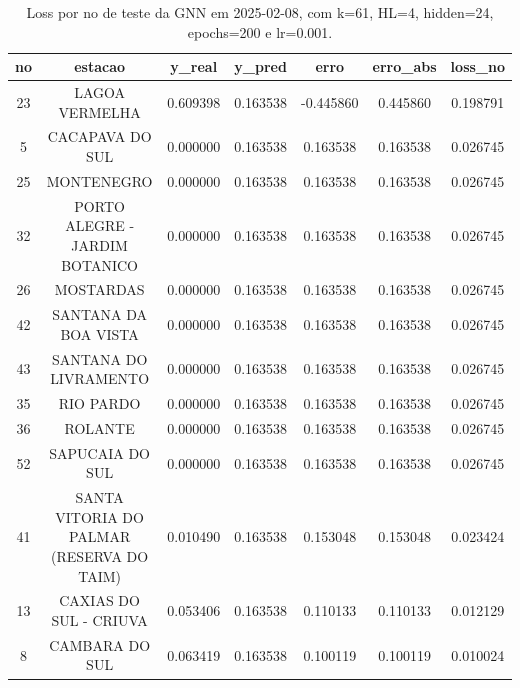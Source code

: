 \begin{table}[h]
\centering
\caption{Loss por no de teste da GNN em 2025-02-08, com k=61, HL=4, hidden=24, epochs=200 e lr=0.001.}
\label{tab:gnn_loss_k61_hl4_h24_e200_d20250208}
\begin{tabular}{ccccccc}
\toprule
no & estacao & y\_real & y\_pred & erro & erro\_abs & loss\_no \\
\midrule
23 & LAGOA VERMELHA & 0.609398 & 0.163538 & -0.445860 & 0.445860 & 0.198791 \\
5 & CACAPAVA DO SUL & 0.000000 & 0.163538 & 0.163538 & 0.163538 & 0.026745 \\
25 & MONTENEGRO & 0.000000 & 0.163538 & 0.163538 & 0.163538 & 0.026745 \\
32 & PORTO ALEGRE - JARDIM BOTANICO & 0.000000 & 0.163538 & 0.163538 & 0.163538 & 0.026745 \\
26 & MOSTARDAS & 0.000000 & 0.163538 & 0.163538 & 0.163538 & 0.026745 \\
42 & SANTANA DA BOA VISTA & 0.000000 & 0.163538 & 0.163538 & 0.163538 & 0.026745 \\
43 & SANTANA DO LIVRAMENTO & 0.000000 & 0.163538 & 0.163538 & 0.163538 & 0.026745 \\
35 & RIO PARDO & 0.000000 & 0.163538 & 0.163538 & 0.163538 & 0.026745 \\
36 & ROLANTE & 0.000000 & 0.163538 & 0.163538 & 0.163538 & 0.026745 \\
52 & SAPUCAIA DO SUL & 0.000000 & 0.163538 & 0.163538 & 0.163538 & 0.026745 \\
41 & SANTA VITORIA DO PALMAR (RESERVA DO TAIM) & 0.010490 & 0.163538 & 0.153048 & 0.153048 & 0.023424 \\
13 & CAXIAS DO SUL - CRIUVA & 0.053406 & 0.163538 & 0.110133 & 0.110133 & 0.012129 \\
8 & CAMBARA DO SUL & 0.063419 & 0.163538 & 0.100119 & 0.100119 & 0.010024 \\
\bottomrule
\end{tabular}
\end{table}
